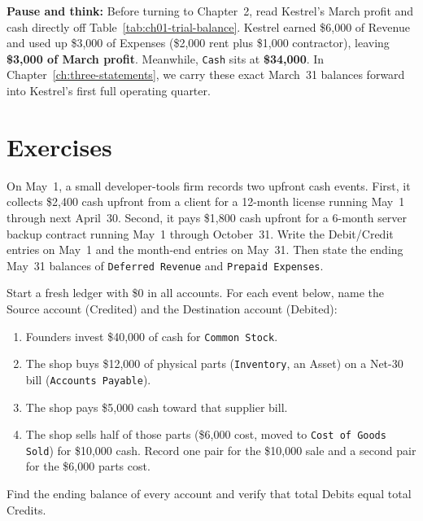 \begin{recoverybox}
\textbf{Pause and think:} Before turning to Chapter~2, read Kestrel's March profit and cash directly off Table~\ref{tab:ch01-trial-balance}. Kestrel earned \$6,000 of Revenue and used up \$3,000 of Expenses (\$2,000 rent plus \$1,000 contractor), leaving \textbf{\$3,000 of March profit}. Meanwhile, \texttt{Cash} sits at \textbf{\$34,000}. In Chapter~\ref{ch:three-statements}, we carry these exact March~31 balances forward into Kestrel's first full operating quarter.
\end{recoverybox}

\section*{Exercises}

\begin{exercise}
\label{ex:ch01-prepaid-deferred}
On May~1, a small developer-tools firm records two upfront cash events. First, it collects \$2,400 cash upfront from a client for a 12-month license running May~1 through next April~30. Second, it pays \$1,800 cash upfront for a 6-month server backup contract running May~1 through October~31. Write the Debit/Credit entries on May~1 and the month-end entries on May~31. Then state the ending May~31 balances of \texttt{Deferred Revenue} and \texttt{Prepaid Expenses}.
\end{exercise}

\begin{exercise}
\label{ex:ch01-graph-edges}
Start a fresh ledger with \$0 in all accounts. For each event below, name the Source account (Credited) and the Destination account (Debited):
\begin{enumerate}
  \item Founders invest \$40,000 of cash for \texttt{Common Stock}.
  \item The shop buys \$12,000 of physical parts (\texttt{Inventory}, an Asset) on a Net-30 bill (\texttt{Accounts Payable}).
  \item The shop pays \$5,000 cash toward that supplier bill.
  \item The shop sells half of those parts (\$6,000 cost, moved to \texttt{Cost of Goods Sold}) for \$10,000 cash. Record one pair for the \$10,000 sale and a second pair for the \$6,000 parts cost.
\end{enumerate}
Find the ending balance of every account and verify that total Debits equal total Credits.
\end{exercise}

